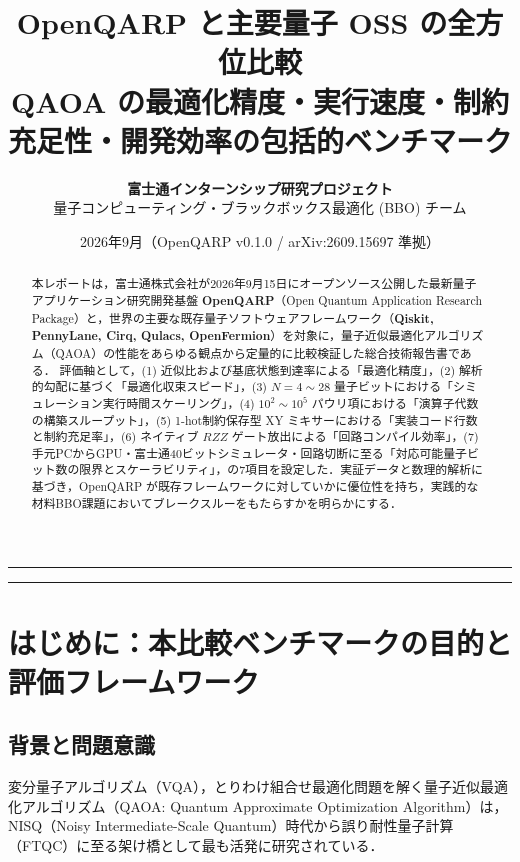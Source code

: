 \documentclass[11pt,a4paper]{ltjsarticle}
\title{
    \vspace{-10mm}
    \Huge\textbf{OpenQARP と主要量子 OSS の全方位比較}\\[3mm]
    \Large QAOA の最適化精度・実行速度・制約充足性・開発効率の包括的ベンチマーク
    \vspace{-2mm}
}
\author{
    \textbf{富士通インターンシップ研究プロジェクト} \\[1mm]
    量子コンピューティング・ブラックボックス最適化 (BBO) チーム
}
\date{2026年9月（OpenQARP v0.1.0 / arXiv:2609.15697 準拠）}
\begin{document}
\maketitle

\begin{abstract}
本レポートは，富士通株式会社が2026年9月15日にオープンソース公開した最新量子アプリケーション研究開発基盤 \textbf{OpenQARP}（Open Quantum Application Research Package）と，世界の主要な既存量子ソフトウェアフレームワーク（\textbf{Qiskit, PennyLane, Cirq, Qulacs, OpenFermion}）を対象に，量子近似最適化アルゴリズム（QAOA）の性能をあらゆる観点から定量的に比較検証した総合技術報告書である．
評価軸として，(1) 近似比および基底状態到達率による「最適化精度」，(2) 解析的勾配に基づく「最適化収束スピード」，(3) $N=4 \sim 28$ 量子ビットにおける「シミュレーション実行時間スケーリング」，(4) $10^2 \sim 10^5$ パウリ項における「演算子代数の構築スループット」，(5) 1-hot制約保存型 XY ミキサーにおける「実装コード行数と制約充足率」，(6) ネイティブ $RZZ$ ゲート放出による「回路コンパイル効率」，(7) 手元PCからGPU・富士通40ビットシミュレータ・回路切断に至る「対応可能量子ビット数の限界とスケーラビリティ」，の7項目を設定した．実証データと数理的解析に基づき，OpenQARP が既存フレームワークに対していかに優位性を持ち，実践的な材料BBO課題においてブレークスルーをもたらすかを明らかにする．
\end{abstract}

\vspace{2mm}
\hrule
\vspace{4mm}

\tableofcontents

\vspace{6mm}
\hrule
\vspace{6mm}

\section{はじめに：本比較ベンチマークの目的と評価フレームワーク}

\subsection{背景と問題意識}
変分量子アルゴリズム（VQA），とりわけ組合せ最適化問題を解く量子近似最適化アルゴリズム（QAOA: Quantum Approximate Optimization Algorithm）は，NISQ（Noisy Intermediate-Scale Quantum）時代から誤り耐性量子計算（FTQC）に至る架け橋として最も活発に研究されている．
\end{document}
